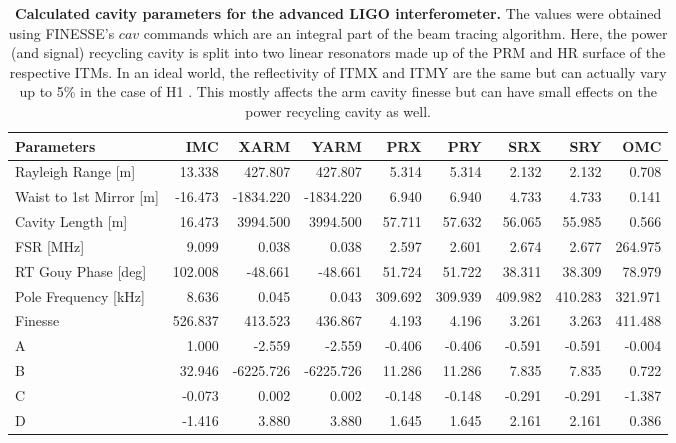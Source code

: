 \begin{table}
	\centering
	\begin{tabular}{|l||r|r|r|r|r|r|r|r|}
		\hline
		{Parameters} &      IMC &      XARM &      YARM &        PRX &        PRY &        SRX &        SRY &        OMC \\
		\hline
		\hline
		Rayleigh Range [m]        &  13.338 &   427.807 &   427.807 &   5.314 &   5.314 &   2.132 &   2.132 &   0.708 \\
		Waist to 1st Mirror [m]   & -16.473 & -1834.220 & -1834.220 &   6.940 &   6.940 &   4.733 &   4.733 &   0.141 \\
		Cavity Length [m]      &  16.473 &  3994.500 &  3994.500 &  57.711 &  57.632 &  56.065 &  55.985 &   0.566 \\
		FSR [MHz]                 &   9.099 &     0.038 &     0.038 &   2.597 &   2.601 &   2.674 &   2.677 & 264.975 \\
		RT Gouy Phase [deg]       & 102.008 &   -48.661 &   -48.661 &  51.724 &  51.722 &  38.311 &  38.309 &  78.979 \\
		Pole Frequency [kHz]      &   8.636 &     0.045 &     0.043 & 309.692 & 309.939 & 409.982 & 410.283 & 321.971 \\
		Finesse                   & 526.837 &   413.523 &   436.867 &   4.193 &   4.196 &   3.261 &   3.263 & 411.488 \\
		A                         &   1.000 &    -2.559 &    -2.559 &  -0.406 &  -0.406 &  -0.591 &  -0.591 &  -0.004 \\
		B                         &  32.946 & -6225.726 & -6225.726 &  11.286 &  11.286 &   7.835 &   7.835 &   0.722 \\
		C                         &  -0.073 &     0.002 &     0.002 &  -0.148 &  -0.148 &  -0.291 &  -0.291 &  -1.387 \\
		D                         &  -1.416 &     3.880 &     3.880 &   1.645 &   1.645 &   2.161 &   2.161 &   0.386 \\
		\hline
	\end{tabular}
	\caption[Calculated cavity parameters for the advanced LIGO interferometer.]
	{\textbf{Calculated cavity parameters for the advanced LIGO interferometer.}
	The values were obtained using FINESSE's $cav$ commands which are an integral part of the beam tracing algorithm. Here, the power (and signal) recycling cavity is split into two linear resonators made up of the PRM and HR surface of the respective ITMs.  In an ideal world, the reflectivity of ITMX and ITMY are the same but can actually vary up to 5\% in the case of H1 \cite{galaxy}. This mostly affects the arm cavity finesse but can have small effects on the power recycling cavity as well.}
	\label{tbl:cav_params}
\end{table}
